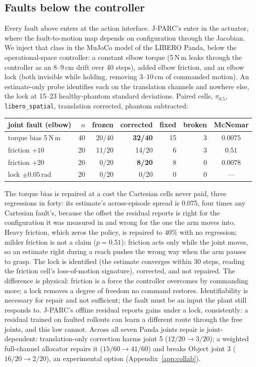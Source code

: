 \documentclass{article}
\newcommand{\code}[1]{\texttt{\small #1}}
\begin{document}
\subsection{Faults below the controller}
\label{sec:joint}

Every fault above enters at the action interface. J-PARC's enter in the actuator, where
the fault-to-motion map depends on configuration through the Jacobian. We inject that
class in the MuJoCo model of the LIBERO Panda, below the operational-space controller: a
constant elbow torque (5\,N\,m leaks through the controller as an 8--9\,cm drift over 40
steps), added elbow friction, and an elbow lock (both invisible while holding, removing
3--10\,cm of commanded motion). An estimate-only probe identifies each on the translation
channels and nowhere else, the lock at 15--23 healthy-phantom standard deviations. Paired
cells, $\pi_{0.5}$, \code{libero\_spatial}, translation corrected, phantom subtracted:

\begin{center}\small
\begin{tabular}{lrrrrrc}
\toprule
joint fault (elbow) & $n$ & frozen & corrected & fixed & broken & McNemar \\
\midrule
torque bias 5\,N\,m & 40 & 20/40 & \textbf{32/40} & 15 & 3 & $0.0075$ \\
friction $+10$ & 20 & 11/20 & 14/20 & 6 & 3 & $0.51$ \\
friction $+20$ & 20 & 0/20 & \textbf{8/20} & 8 & 0 & $0.0078$ \\
lock $\pm0.05$\,rad & 20 & 0/20 & 0/20 & 0 & 0 & --- \\
\bottomrule
\end{tabular}
\end{center}

The torque bias is repaired at a cost the Cartesian cells never paid, three regressions in
forty: its estimate's across-episode spread is 0.075, four times any Cartesian fault's,
because the offset the residual reports is right for the configuration it was measured in
and wrong for the one the arm moves into. Heavy friction, which zeros the policy, is
repaired to $40\%$ with no regression; milder friction is not a claim ($p=0.51$): friction
acts only while the joint moves, so an estimate right during a reach pushes the wrong way
when the arm pauses to grasp. The lock is identified (the estimate converges within 30
steps, reading the friction cell's loss-of-motion signature), corrected, and not repaired.
The difference is physical: friction is a force the controller overcomes by commanding
more; a lock removes a degree of freedom no command restores. Identifiability is necessary
for repair and not sufficient; the fault must be an input the plant still responds to.
J-PARC's offline residual reports gains under a lock, consistently: a residual trained on
faulted rollouts can learn a different route through the free joints, and this law cannot.
Across all seven Panda joints repair is joint-dependent: translation-only correction harms
joint 5 ($12/20\to3/20$); a weighted full-channel allocator repairs it ($15/60\to41/60$) and
breaks Object joint 3 ($16/20\to2/20$), an experimental option (Appendix~\ref{app:collab}).
\end{document}
